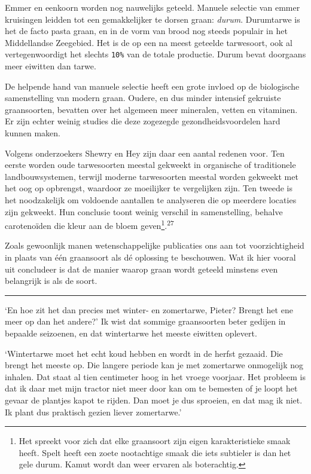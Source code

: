 \documentclass[
  11pt,
  dutch,
]{memoir}
\begin{document}
Emmer en eenkoorn worden nog nauwelijks geteeld. Manuele selectie van
emmer kruisingen leidden tot een gemakkelijker te dorsen graan:
\emph{durum}. Durumtarwe is het de facto pasta graan, en in de vorm van
brood nog steeds populair in het Middellandse Zeegebied. Het is de op
een na meest geteelde tarwesoort, ook al vertegenwoordigt het slechts
\texttt{10\%} van de totale productie. Durum bevat doorgaans meer
eiwitten dan tarwe.

De helpende hand van manuele selectie heeft een grote invloed op de
biologische samenstelling van modern graan. Oudere, en dus minder
intensief gekruiste graansoorten, bevatten over het algemeen meer
mineralen, vetten en vitaminen. Er zijn echter weinig studies die deze
zogezegde gezondheidsvoordelen hard kunnen maken.

Volgens onderzoekers Shewry en Hey zijn daar een aantal redenen voor.
Ten eerste worden oude tarwesoorten meestal gekweekt in organische of
traditionele landbouwsystemen, terwijl moderne tarwesoorten meestal
worden gekweekt met het oog op opbrengst, waardoor ze moeilijker te
vergelijken zijn. Ten tweede is het noodzakelijk om voldoende aantallen
te analyseren die op meerdere locaties zijn gekweekt. Hun conclusie
toont weinig verschil in samenstelling, behalve carotenoïden die kleur
aan de bloem geven\footnote{Het spreekt voor zich dat elke graansoort
  zijn eigen karakteristieke smaak heeft. Spelt heeft een zoete
  nootachtige smaak die iets subtieler is dan het gele durum. Kamut
  wordt dan weer ervaren als boterachtig.}.\textsuperscript{27}

Zoals gewoonlijk manen wetenschappelijke publicaties ons aan tot
voorzichtigheid in plaats van één graansoort als dé oplossing te
beschouwen. Wat ik hier vooral uit concludeer is dat de manier waarop
graan wordt geteeld minstens even belangrijk is als de soort.

\pfbreak

`En hoe zit het dan precies met winter- en zomertarwe, Pieter? Brengt
het ene meer op dan het andere?' Ik wist dat sommige graansoorten beter
gedijen in bepaalde seizoenen, en dat wintertarwe het meeste eiwitten
oplevert.

`Wintertarwe moet het echt koud hebben en wordt in de herfst gezaaid.
Die brengt het meeste op. Die langere periode kan je met zomertarwe
onmogelijk nog inhalen. Dat staat al tien centimeter hoog in het vroege
voorjaar. Het probleem is dat ik daar met mijn tractor niet meer door
kan om te bemesten of je loopt het gevaar de plantjes kapot te rijden.
Dan moet je dus sproeien, en dat mag ik niet. Ik plant dus praktisch
gezien liever zomertarwe.'
\end{document}
